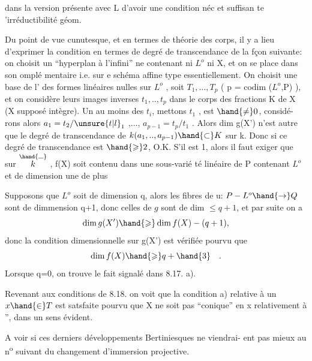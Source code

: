 
dans la version présente  avec L d'avoir une condition néc et suffisan%
te 'irréductibilité géom. 

Du point de vue cunutesque,  et en termes de théorie des
corps, il y a lieu d'exprimer la condition  en termes de
degré de transcendance de la fçon suivante: on choisit un ``hyperplan
à l'infini'' ne contenant ni $L^{o}$ ni X, et on se place dans son omplé%
mentaire i.e. sur e schéma affine  type essentiellement. On choisit
une base de l' des formes linéaires nulles sur $L^{o}$ , 
 soit $T_{1},\ldots,T_{p}$ ( p = codim ($L^{o}$,P) ), et on considère
leurs images inverses $t_{1},..,t_{p}$ dans le corps des fractions K de X
(X supposé intègre). Un au moins des $t_{i}$, mettons $t_{1}$ , est $\hand{\neq} 0$, considé-%
rons alors $a_{1} = t_{2}/\unsure{t|l}_{1}$ ,..., $a_{p-1} = t_{p}/t_{1}$ . Alors dim g(X') n'est
autre que le degré de transcendance de $k(a_{1},..,a_{p-1}) \hand{\subset} K$ sur k. Donc
si ce degré de transcendance est $\hand{\geqslant} 2$, O.K.  S'il est 1,
alors il faut exiger que sur $\overset{\hand{\rule{0.6em}{0.35pt}}}{k}$ , f(X) soit contenu dans une sous-varié%
té linéaire de P contenant $L^{o}$ et de dimension une de plus

Supposons que $L^{o}$ soit de dimension q, alors les fibres de u:
$P - L^{o} \hand{\to} Q$ sont de dimmension q+1, donc celles de $g$ sont de dim $\leq q+1$, et par suite on a
\[ \dim g(X') \hand{\geqslant} \dim f(X) - (q+1) , \]
donc la condition dimensionnelle sur g(X') est vérifiée pourvu que
\[ \dim f(X) \hand{\geqslant} q+\hand{3} \quad . \]
Lorsque q=0, on trouve le fait signalé dans 8.17. a).  

Revenant aux conditions de 8.18. on voit que la condition a)
relative à un $x \hand{\in} T$ est satsfaite pourvu que X ne soit pas ``conique''
en x relativement à '', dans un sens évident.

A voir si ces derniers développements Bertiniesques ne viendrai-%
ent pas mieux au n\textsuperscript{o} suivant du changement d'immersion projective. 

